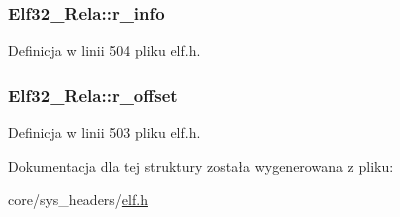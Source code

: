 \hypertarget{struct_elf32___rela_ac3a79d3f04209c33ddb4c36d07e68a79}{
\subsubsection[{r\-\_\-info}]{ Elf32\-\_\-\-Rela\-::r\-\_\-info}}\label{struct_elf32___rela_ac3a79d3f04209c33ddb4c36d07e68a79}


Definicja w linii 504 pliku elf.\-h.

\hypertarget{struct_elf32___rela_aa850a306ee7fa3935a9f8c3d1aae4e51}{
\subsubsection[{r\-\_\-offset}]{ Elf32\-\_\-\-Rela\-::r\-\_\-offset}}\label{struct_elf32___rela_aa850a306ee7fa3935a9f8c3d1aae4e51}


Definicja w linii 503 pliku elf.\-h.



Dokumentacja dla tej struktury została wygenerowana z pliku\-:\begin{DoxyCompactItemize}
\item 
core/sys\-\_\-headers/\hyperlink{elf_8h}{elf.\-h}\end{DoxyCompactItemize}
